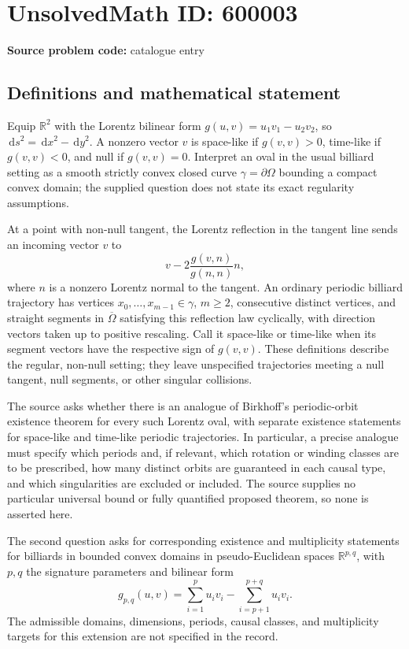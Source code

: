 \documentclass[11pt]{article}
\newcommand{\R}{\mathbb{R}}
\newcommand{\dd}{\,\mathrm{d}}
\begin{document}
\section*{UnsolvedMath ID: 600003}
\textbf{Source problem code:} catalogue entry
\subsection{Definitions and mathematical statement}
Equip $\R^2$ with the Lorentz bilinear form $g(u,v)=u_1v_1-u_2v_2$, so $\dd s^2=\dd x^2-\dd y^2$. A nonzero vector $v$ is space-like if $g(v,v)>0$, time-like if $g(v,v)<0$, and null if $g(v,v)=0$. Interpret an oval in the usual billiard setting as a smooth strictly convex closed curve $\gamma=\partial\Omega$ bounding a compact convex domain; the supplied question does not state its exact regularity assumptions.

At a point with non-null tangent, the Lorentz reflection in the tangent line sends an incoming vector $v$ to
\[
v-2\frac{g(v,n)}{g(n,n)}n,
\]
where $n$ is a nonzero Lorentz normal to the tangent. An ordinary periodic billiard trajectory has vertices $x_0,\ldots,x_{m-1}\in\gamma$, $m\ge2$, consecutive distinct vertices, and straight segments in $\overline\Omega$ satisfying this reflection law cyclically, with direction vectors taken up to positive rescaling. Call it space-like or time-like when its segment vectors have the respective sign of $g(v,v)$. These definitions describe the regular, non-null setting; they leave unspecified trajectories meeting a null tangent, null segments, or other singular collisions.

The source asks whether there is an analogue of Birkhoff's periodic-orbit existence theorem for every such Lorentz oval, with separate existence statements for space-like and time-like periodic trajectories. In particular, a precise analogue must specify which periods and, if relevant, which rotation or winding classes are to be prescribed, how many distinct orbits are guaranteed in each causal type, and which singularities are excluded or included. The source supplies no particular universal bound or fully quantified proposed theorem, so none is asserted here.

The second question asks for corresponding existence and multiplicity statements for billiards in bounded convex domains in pseudo-Euclidean spaces $\R^{p,q}$, with $p,q$ the signature parameters and bilinear form
\[
g_{p,q}(u,v)=\sum_{i=1}^{p}u_iv_i-\sum_{i=p+1}^{p+q}u_iv_i.
\]
The admissible domains, dimensions, periods, causal classes, and multiplicity targets for this extension are not specified in the record.
\end{document}
